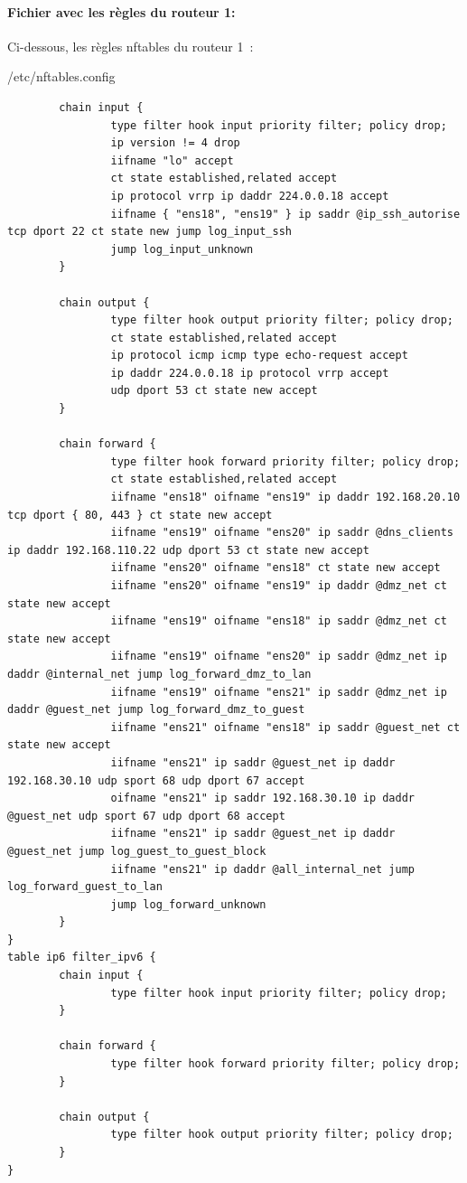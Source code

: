 \documentclass{article}
\begin{document}
\paragraph{Fichier avec les règles du routeur 1:}

Ci-dessous, les règles nftables du routeur 1~:

\begin{configbox}{/etc/nftables.config}
\begin{lstlisting}
        chain input {
                type filter hook input priority filter; policy drop;
                ip version != 4 drop
                iifname "lo" accept
                ct state established,related accept
                ip protocol vrrp ip daddr 224.0.0.18 accept
                iifname { "ens18", "ens19" } ip saddr @ip_ssh_autorise tcp dport 22 ct state new jump log_input_ssh
                jump log_input_unknown
        }

        chain output {
                type filter hook output priority filter; policy drop;
                ct state established,related accept
                ip protocol icmp icmp type echo-request accept
                ip daddr 224.0.0.18 ip protocol vrrp accept
                udp dport 53 ct state new accept
        }

        chain forward {
                type filter hook forward priority filter; policy drop;
                ct state established,related accept
                iifname "ens18" oifname "ens19" ip daddr 192.168.20.10 tcp dport { 80, 443 } ct state new accept
                iifname "ens19" oifname "ens20" ip saddr @dns_clients ip daddr 192.168.110.22 udp dport 53 ct state new accept
                iifname "ens20" oifname "ens18" ct state new accept
                iifname "ens20" oifname "ens19" ip daddr @dmz_net ct state new accept
                iifname "ens19" oifname "ens18" ip saddr @dmz_net ct state new accept
                iifname "ens19" oifname "ens20" ip saddr @dmz_net ip daddr @internal_net jump log_forward_dmz_to_lan
                iifname "ens19" oifname "ens21" ip saddr @dmz_net ip daddr @guest_net jump log_forward_dmz_to_guest
                iifname "ens21" oifname "ens18" ip saddr @guest_net ct state new accept
                iifname "ens21" ip saddr @guest_net ip daddr 192.168.30.10 udp sport 68 udp dport 67 accept
                oifname "ens21" ip saddr 192.168.30.10 ip daddr @guest_net udp sport 67 udp dport 68 accept
                iifname "ens21" ip saddr @guest_net ip daddr @guest_net jump log_guest_to_guest_block
                iifname "ens21" ip daddr @all_internal_net jump log_forward_guest_to_lan
                jump log_forward_unknown
        }
}
table ip6 filter_ipv6 {
        chain input {
                type filter hook input priority filter; policy drop;
        }

        chain forward {
                type filter hook forward priority filter; policy drop;
        }

        chain output {
                type filter hook output priority filter; policy drop;
        }
}

\end{lstlisting}
\end{configbox}
\end{document}
